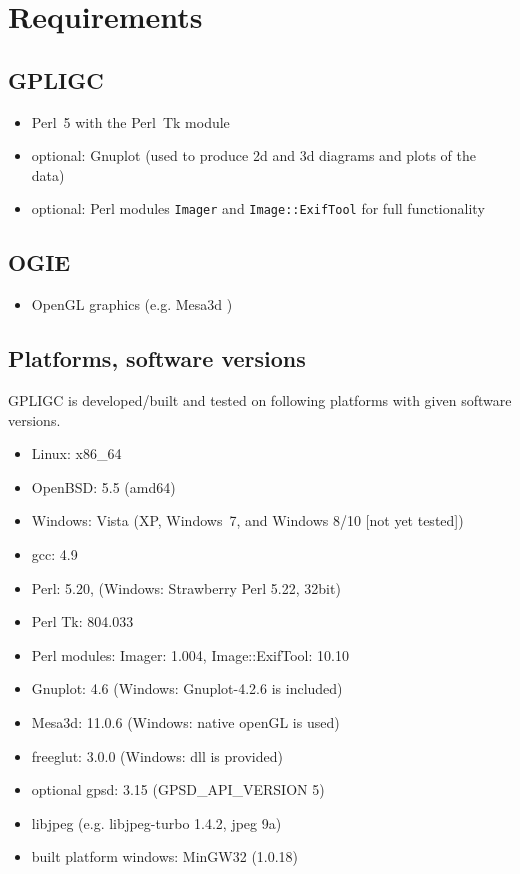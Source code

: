 \section{Requirements}
\label{requirements}

\subsection*{GPLIGC}

\begin{itemize}
\item Perl~5 with the Perl~Tk module \cite{perl,perltk}
\item {\scriptsize optional:} Gnuplot \cite{gnuplot} (used to produce 2d and 3d diagrams and plots of the data)
\item {\scriptsize optional:} Perl modules \texttt{Imager} \cite{imager} and \texttt{Image::ExifTool} \cite{exiftool} for full functionality
\end{itemize}


\subsection*{OGIE}

\begin{itemize}
\item OpenGL graphics (e.g. Mesa3d \cite{mesa})
\end{itemize}


\subsection*{Platforms, software versions}
GPLIGC is developed/built and tested on following platforms with given software versions.

\begin{itemize}
\item Linux: x86\_64
\item OpenBSD: 5.5 (amd64)
\item Windows: Vista (XP, Windows~7, and Windows 8/10 [not yet tested])
\item gcc: 4.9 %
\item Perl: 5.20, %
(Windows: Strawberry Perl 5.22, 32bit)
\item Perl Tk: 804.033
\item Perl modules: Imager: 1.004, %
Image::ExifTool: 10.10
\item Gnuplot: 4.6 (Windows: Gnuplot-4.2.6 is included)
\item Mesa3d: 11.0.6 (Windows: native openGL is used)
\item freeglut: 3.0.0 (Windows: dll is provided)
\item {\scriptsize optional} gpsd: 3.15 (GPSD\_API\_VERSION 5)
\item libjpeg (e.g. libjpeg-turbo 1.4.2, jpeg 9a)
\item built platform windows: MinGW32 (1.0.18)
\end{itemize}
